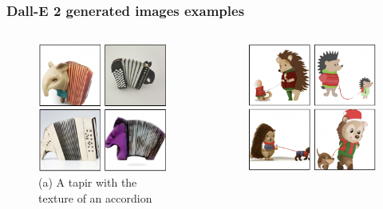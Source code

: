 \documentclass[
	11pt, compress%
]{beamer}
\begin{document}
\begin{frame}
	\frametitle{Dall-E 2 generated images examples}
	\begin{columns}[c] 
		\begin{column}{0.5\textwidth} %
			\begin{figure}
				\includegraphics[width=0.95\linewidth]{Images/exampleTapir.png}
				\caption{(a) A tapir with the texture of an accordion \cite{DBLP:journals/corr/abs-2102-12092}}
			\end{figure}
		\end{column}
		\begin{column}{0.5\textwidth} %
			\begin{figure}
				\includegraphics[width=0.95\linewidth]{Images/exampleHedgehog.png}

\end{figure}
\end{column}
\end{columns}
\end{frame}
\end{document}
